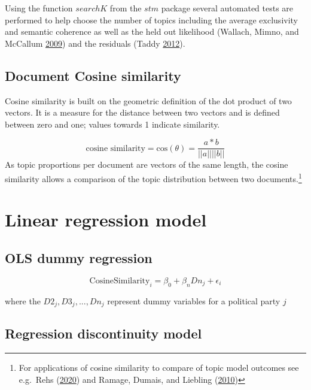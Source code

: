 \documentclass[
]{article}
\begin{document}
Using the function \(searchK\) from the \(stm\) package several
automated tests are performed to help choose the number of topics
including the average exclusivity and semantic coherence as well as the
held out likelihood (Wallach, Mimno, and McCallum
\protect\hyperlink{ref-wallach_rethinking_2009}{2009}) and the residuals
(Taddy \protect\hyperlink{ref-taddy_estimation_2012}{2012}).

\hypertarget{document-cosine-similarity}{%
\subsection{Document Cosine
similarity}\label{document-cosine-similarity}}

Cosine similarity is built on the geometric definition of the dot
product of two vectors. It is a measure for the distance between two
vectors and is defined between zero and one; values towards 1 indicate
similarity.

\[
\text{cosine similarity} = \text{cos}(\theta)=\frac{a*b}{||a|| ||b||}
\] As topic proportions per document are vectors of the same length, the
cosine similarity allows a comparison of the topic distribution between
two documents.\footnote{For applications of cosine similarity to compare
  of topic model outcomes see e.g.~Rehs
  (\protect\hyperlink{ref-rehs_structural_2020}{2020}) and Ramage,
  Dumais, and Liebling
  (\protect\hyperlink{ref-ramage_characterizing_2010}{2010})}

\hypertarget{linear-regression-model}{%
\section{Linear regression model}\label{linear-regression-model}}

\hypertarget{ols-dummy-regression}{%
\subsection{OLS dummy regression}\label{ols-dummy-regression}}

\[
\text{CosineSimilarity}_{i}=\beta_0+\beta_nDn_{j}+\epsilon_i
\]

where the \(D2_{j}, D3_{j}, ... ,Dn_{j}\) represent dummy variables for
a political party \(j\)

\hypertarget{regression-discontinuity-model}{%
\subsection{Regression discontinuity
model}\label{regression-discontinuity-model}}
\end{document}
